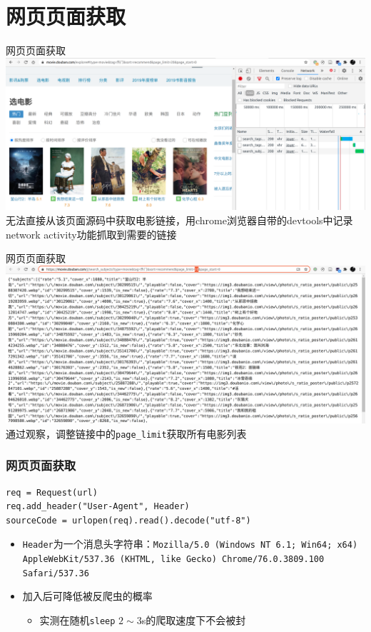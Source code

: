 \documentclass{ctexbeamer}
\begin{document}
\section{网页页面获取}
\begin{frame}{网页页面获取}
	\includegraphics[width=\textwidth]{f12.png}
	无法直接从该页面源码中获取电影链接，用chrome浏览器自带的devtools中记录network activity功能抓取到需要的链接
\end{frame}
\begin{frame}{网页页面获取}
	\includegraphics[width=\textwidth]{background.png}
	通过观察，调整链接中的\texttt{page\_limit}获取所有电影列表
\end{frame}
\begin{frame}[fragile]
	\frametitle{网页页面获取}
\begin{lstlisting}
req = Request(url)
req.add_header("User-Agent", Header)
sourceCode = urlopen(req).read().decode("utf-8")
\end{lstlisting}
	\begin{itemize}
		\item \texttt{Header}为一个消息头字符串：\texttt{Mozilla/5.0 (Windows NT 6.1; Win64; x64) AppleWebKit/537.36 (KHTML, like Gecko) Chrome/76.0.3809.100 Safari/537.36}
		\pause \item 加入后可降低被反爬虫的概率
		\begin{itemize}
			\item 实测在随机\texttt{sleep} $2\sim 3$s的爬取速度下不会被封
		\end{itemize}
	\end{itemize}
\end{frame}
\end{document}
